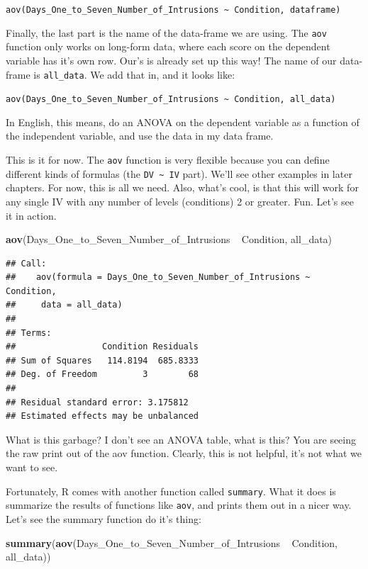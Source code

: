 \documentclass[]{book}
\newenvironment{Shaded}{\begin{snugshade}}{\end{snugshade}}
\newcommand{\KeywordTok}[1]{\textcolor[rgb]{0.13,0.29,0.53}{\textbf{{#1}}}}
\newcommand{\StringTok}[1]{\textcolor[rgb]{0.31,0.60,0.02}{{#1}}}
\newcommand{\NormalTok}[1]{{#1}}
\theoremstyle{definition}
\theoremstyle{definition}
\theoremstyle{definition}
\theoremstyle{remark}
\begin{document}
\texttt{aov(Days\_One\_to\_Seven\_Number\_of\_Intrusions\ \textasciitilde{}\ Condition,\ dataframe)}

Finally, the last part is the name of the data-frame we are using. The
\texttt{aov} function only works on long-form data, where each score on
the dependent variable has it's own row. Our's is already set up this
way! The name of our data-frame is \texttt{all\_data}. We add that in,
and it looks like:

\texttt{aov(Days\_One\_to\_Seven\_Number\_of\_Intrusions\ \textasciitilde{}\ Condition,\ all\_data)}

In English, this means, do an ANOVA on the dependent variable as a
function of the independent variable, and use the data in my data frame.

This is it for now. The \texttt{aov} function is very flexible because
you can define different kinds of formulas (the
\texttt{DV\ \textasciitilde{}\ IV} part). We'll see other examples in
later chapters. For now, this is all we need. Also, what's cool, is that
this will work for any single IV with any number of levels (conditions)
2 or greater. Fun. Let's see it in action.

\begin{Shaded}
\begin{Highlighting}[]
\KeywordTok{aov}\NormalTok{(Days_One_to_Seven_Number_of_Intrusions ~}\StringTok{ }\NormalTok{Condition, all_data)}
\end{Highlighting}
\end{Shaded}

\begin{verbatim}
## Call:
##    aov(formula = Days_One_to_Seven_Number_of_Intrusions ~ Condition, 
##     data = all_data)
## 
## Terms:
##                 Condition Residuals
## Sum of Squares   114.8194  685.8333
## Deg. of Freedom         3        68
## 
## Residual standard error: 3.175812
## Estimated effects may be unbalanced
\end{verbatim}

What is this garbage? I don't see an ANOVA table, what is this? You are
seeing the raw print out of the aov function. Clearly, this is not
helpful, it's not what we want to see.

Fortunately, R comes with another function called \texttt{summary}. What
it does is summarize the results of functions like \texttt{aov}, and
prints them out in a nicer way. Let's see the summary function do it's
thing:

\begin{Shaded}
\begin{Highlighting}[]
\KeywordTok{summary}\NormalTok{(}\KeywordTok{aov}\NormalTok{(Days_One_to_Seven_Number_of_Intrusions ~}\StringTok{ }\NormalTok{Condition, all_data))}
\end{Highlighting}
\end{Shaded}
\end{document}
